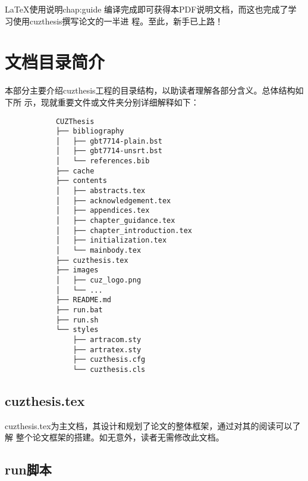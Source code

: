 \begin{cuzchapter}{\LaTeX{}使用说明}{chap:guide}
	编译完成即可获得本PDF说明文档，而这也完成了学习使用cuzthesis撰写论文的一半进
	程。至此，新手已上路！

	\section{文档目录简介}\label{sec:directory}

	本部分主要介绍cuzthesis工程的目录结构，以助读者理解各部分含义。总体结构如下所
	示，现就重要文件或文件夹分别详细解释如下：

	\begingroup
	\small\linespread{1}
	\begin{center}
		\begin{verbatim}
            CUZThesis
            ├── bibliography
            │   ├── gbt7714-plain.bst
            │   ├── gbt7714-unsrt.bst
            │   └── references.bib
            ├── cache
            ├── contents
            │   ├── abstracts.tex
            │   ├── acknowledgement.tex
            │   ├── appendices.tex
            │   ├── chapter_guidance.tex
            │   ├── chapter_introduction.tex
            │   ├── initialization.tex
            │   └── mainbody.tex
            ├── cuzthesis.tex
            ├── images
            │   ├── cuz_logo.png
            │   └── ...
            ├── README.md
            ├── run.bat
            ├── run.sh
            └── styles
                ├── artracom.sty
                ├── artratex.sty
                ├── cuzthesis.cfg
                └── cuzthesis.cls
        \end{verbatim}
	\end{center}
	\endgroup

	\subsection{cuzthesis.tex}\label{sub:cuzthesis}

	cuzthesis.tex为主文档，其设计和规划了论文的整体框架，通过对其的阅读可以了解
	整个论文框架的搭建。如无意外，读者无需修改此文档。

	\subsection{run脚本}\label{sub:scripts}


\end{cuzchapter}
